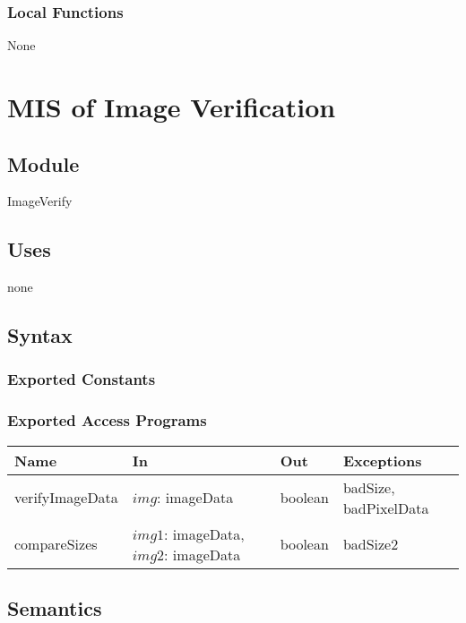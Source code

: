 \documentclass[12pt, titlepage]{article}
\begin{document}
\subsubsection{Local Functions}

None

\newpage

\section{MIS of Image Verification} \label{Md_Verify}

\subsection{Module}

ImageVerify

\subsection{Uses}

none

\subsection{Syntax}

\subsubsection{Exported Constants}

\subsubsection{Exported Access Programs}

\begin{center}
\begin{tabular}{p{3cm} p{3.5cm} p{2cm} p{6cm}}
\hline
\textbf{Name} & \textbf{In} & \textbf{Out} & \textbf{Exceptions} \\
\hline
verifyImageData & $img$: imageData & boolean & badSize,
badPixelData\\
compareSizes & $img1$: imageData,  $img2$: imageData & boolean & badSize2\\
\hline
\end{tabular}
\end{center}

\subsection{Semantics}
\end{document}
